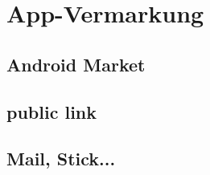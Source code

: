 \newpage
\section{App-Vermarkung}

\subsection{Android Market}

\newpage
\subsection{public link}

\newpage
\subsection{Mail, Stick...}